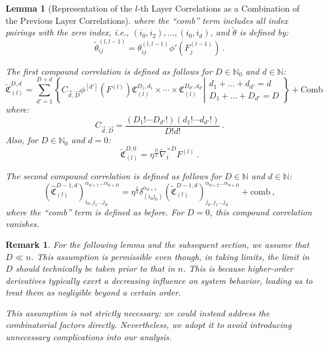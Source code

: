 \documentclass{article} %
\newtheorem{lemma}[theorem]{Lemma}
\newtheorem{remark}{Remark}
[section]
\begin{document}
\begin{lemma}[Representation of the \(l\)-th Layer Correlations as a Combination of the Previous Layer Correlations]
\textup
{where the ``comb'' term includes all index pairings with the zero index, i.e., \(\left(i_{0},i_{2}\right),\ldots,\left(i_{0},i_{d}\right)\), and \(\tilde{\theta}\) is defined by:
\begin{equation}
\tilde{\theta}_{ij}^{\left(l,l-1\right)}=\theta_{ij}^{\left(l,l-1\right)}\phi'\left(F_{j}^{\left(l-1\right)}\right) \ .
\end{equation}
}

\textup
{The first compound correlation is defined as follows for \(D\in\mathbb{N}_0\) and \(d\in\mathbb{N}\):
\begin{equation}
\tilde{\mathfrak{C}}_{\left(l\right)}^{D,d}=\sum_{d'=1}^{D+d}\left\{ C_{\vec{d},\vec{D}}\phi^{\left[d'\right]}\left(F^{(l)}\right)\mathfrak{C}_{\left(l\right)}^{D_{1},d_{1}}\times\cdots\times\mathfrak{C}_{\left(l\right)}^{D_{d'},d_{d'}}\left|\begin{array}{c}
d_{1}+\ldots+d_{d'}=d\\
D_{1}+\ldots+D_{d'}=D
\end{array}\right.\right\} +\text{Comb}
\end{equation}
where:
\begin{equation}
C_{\vec{d},\vec{D}}=\frac{\left(D_{1}!\cdots D_{d'}!\right)\left(d_{1}!\cdots d_{d'}!\right)}{D!d!} \ .
\end{equation}
Also, for \(D\in\mathbb{N}_0\) and \(d=0\):
\begin{equation}
\tilde{\mathfrak{C}}_{\left(l\right)}^{D,0}=\eta^{\frac{D}{2}}\tilde{\nabla}_{t}^{\times D}F^{(l)} \ .
\end{equation}
}

\textup
{The second compound correlation is defined as follows for \(D\in\mathbb{N}\) and \(d\in\mathbb{N}\):
\begin{equation}
\left(\hat{\mathfrak{C}}_{\left(l\right)}^{D-1,d}\right)_{i_{0},j_{1}\ldots j_{d}}^{\alpha_{d+1}\ldots\alpha_{d+D}}=\eta^{\frac{1}{2}}\delta_{\left(i_{0}j_{0}\right)}^{\alpha_{d+1}}\left(\tilde{\mathfrak{C}}_{\left(l\right)}^{D-1,d}\right)_{j_{0},j_{1}\ldots j_{d}}^{\alpha_{d+2}\ldots\alpha_{d+D}}+\text{comb} \ ,
\end{equation}
where the ``comb'' term is defined as before. For \(D=0\), this compound correlation vanishes.
}
\end{lemma}

\begin{remark}
\textup
{For the following lemma and the subsequent section, we assume that \(D\ll n\). This assumption is permissible even though, in taking limits, the limit in \(D\) should technically be taken prior to that in \(n\). This is because higher-order derivatives typically exert a decreasing influence on system behavior, leading us to treat them as negligible beyond a certain order.}

\textup
{This assumption is not strictly necessary: we could instead address the combinatorial factors directly. Nevertheless, we adopt it to avoid introducing unnecessary complications into our analysis.}
\end{remark}
\end{document}
